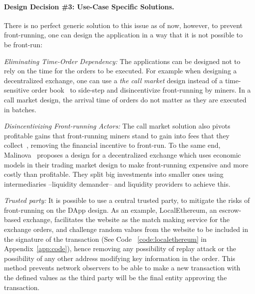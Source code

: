 \paragraph{Design Decision \#3: Use-Case Specific Solutions.}
There is no perfect generic solution to this issue as of now, however, to prevent front-running, one can design the application in a way that it is not possible to be front-run:

\begin{compactlist}

\item \emph{Eliminating Time-Order Dependency:} The applications can be designed not to rely on the time for the orders to be executed. For example when designing a decentralized exchange, one can use a \emph{the call market} design instead of a time-sensitive order book~\cite{clark2014decentralizing} to side-step and disincentivize front-running by miners. In a call market design, the arrival time of orders do not matter as they are executed in batches. 

\item \emph{Disincentivizing Front-running Actors:} The call market solution also pivots profitable gains that front-running miners stand to gain into fees that they collect~\cite{clark2014decentralizing}, removing the financial incentive to front-run. To the same end, Malinova~\cite{malinova2017market} proposes a design for a decentralized exchange which uses economic models in their trading market design to make front-running expensive and more costly than profitable. They split big investments into smaller ones using intermediaries --liquidity demander-- and liquidity providers to achieve this.


\item \emph{Trusted party:} It is possible to use a central trusted party, to mitigate the risks of front-running on the DApp design. As an example, LocalEthereum, an escrow-based exchange, facilitates the website as the match making service for the exchange orders, and challenge random values from the website to be included in the signature of the transaction (See Code ~\ref{code:localethereum} in Appendix~\ref{app:code}), hence removing any possibility of replay attack or the possibility of any other address modifying key information in the order. This method prevents network observers to be able to make a new transaction with the defined values as the third party will be the final entity approving the transaction.
 \end{compactlist}

